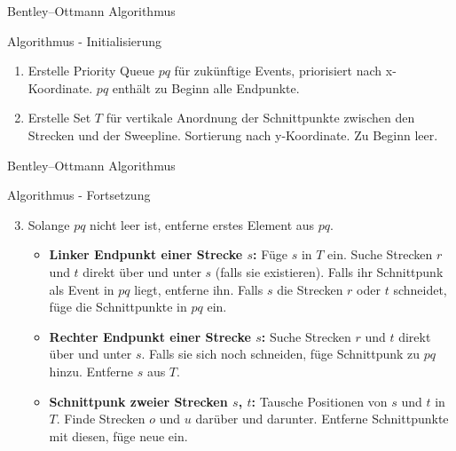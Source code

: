 \documentclass[18pt]{beamer}
\begin{document}
\begin{frame}{Bentley–Ottmann Algorithmus}
	\begin{block}{Algorithmus - Initialisierung}
		\begin{enumerate}
			\item Erstelle Priority Queue $pq$ für zukünftige Events, priorisiert nach x-Koordinate. $pq$ enthält zu Beginn alle Endpunkte.
			\item Erstelle Set $T$ für vertikale Anordnung der Schnittpunkte zwischen den Strecken und der Sweepline. Sortierung nach y-Koordinate. Zu Beginn leer.
		\end{enumerate}
	\end{block}
\end{frame}

\begin{frame}{Bentley–Ottmann Algorithmus}
	\begin{block}{Algorithmus - Fortsetzung}
		\begin{enumerate}
			\setcounter{enumi}{2}
			\item Solange $pq$ nicht leer ist, entferne erstes Element aus $pq$.
			\begin{itemize}
				\item \textbf{Linker Endpunkt einer Strecke $s$:} Füge $s$ in $T$ ein. Suche Strecken $r$ und $t$ direkt über und unter $s$ (falls sie existieren). Falls ihr Schnittpunk als Event in $pq$ liegt, entferne ihn. Falls $s$ die Strecken $r$ oder $t$ schneidet, füge die Schnittpunkte in $pq$ ein.
				
				\item \textbf{Rechter Endpunkt einer Strecke $s$:} Suche Strecken $r$ und $t$ direkt über und unter $s$. Falls sie sich noch schneiden, füge Schnittpunk zu $pq$ hinzu. Entferne $s$ aus $T$. 
				
				\item \textbf{Schnittpunk zweier Strecken $s$, $t$:} Tausche Positionen von $s$ und $t$ in $T$. Finde Strecken $o$ und $u$ darüber und darunter. Entferne Schnittpunkte mit diesen, füge neue ein.
			\end{itemize}
		\end{enumerate}
	\end{block}
\end{frame}
\end{document}
